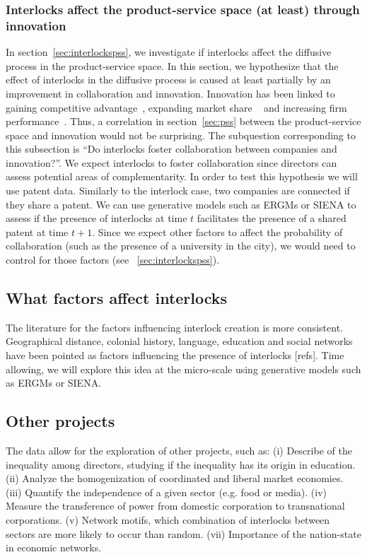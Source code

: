 \subsubsection{Interlocks affect the product-service space (at least) through innovation}
In section~\ref{sec:interlockspss}, we investigate if interlocks affect the diffusive process in the product-service space.
In this section, we hypothesize that the effect of interlocks in the diffusive process is caused at least partially by an improvement in collaboration and innovation.
Innovation has been linked to gaining competitive advantage~\citep{Hitt1996}, expanding market share ~\citep{Franko1989} and increasing firm performance~\citep{Morbey1988}.
Thus, a correlation in section~\ref{sec:pss} between the product-service space and innovation would not be surprising. 
The subquestion corresponding to this subsection is ``Do interlocks foster collaboration between companies and innovation?''.
We expect interlocks to foster collaboration since directors can assess potential areas of complementarity.
In order to test this hypothesis we will use patent data.
Similarly to the interlock case, two companies are connected if they share a patent.
We can use generative models such as ERGMs or SIENA to assess if the presence of interlocks at time $t$ facilitates the presence of a shared patent at time $t+1$. 
Since we expect other factors to affect the probability of collaboration (such as the presence of a university in the city),
we would need to control for those factors (see ~\ref{sec:interlockspss}).


\subsection{What factors affect interlocks}
\label{sec:factors}
The literature for the factors influencing interlock creation is more consistent.
Geographical distance, colonial history, language, education and social networks have been pointed as factors influencing the presence of interlocks [refs].
Time allowing, we will explore this idea at the micro-scale using generative models such as ERGMs or SIENA.


\subsection{Other projects}
\label{sec:other}
The data allow for the exploration of other projects, such as:
(i) Describe of the inequality among directors, studying if the inequality has its origin in education.
(ii) Analyze the homogenization of coordinated and liberal market economies.
(iii) Quantify the independence of a given sector (e.g. food or media).
(iv) Measure the transference of power from domestic corporation to transnational corporations.
(v) Network motifs, which combination of interlocks between sectors are more likely to occur than random.
(vii) Importance of the nation-state in economic networks.